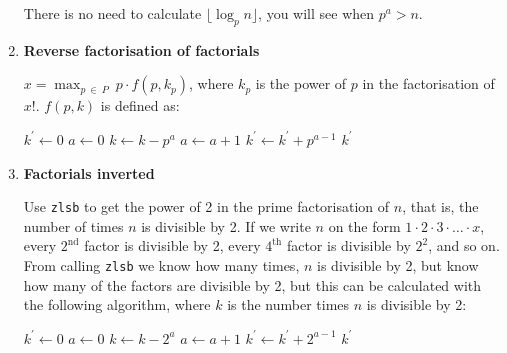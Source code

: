 \begin{enumerate}[label=\textbf{\arabic*}.]
There is no need to calculate $\lfloor \log_p n \rfloor$,
you will see when $p^a > n$.



\item \textbf{Reverse factorisation of factorials}

$\displaystyle{x = \max_{p ~\in~ P} ~ p \cdot f(p, k_p)}$,
where $k_p$ is the power of $p$ in the factorisation
of $x!$. $f(p, k)$ is defined as:

\vspace{1em}
\hspace{-2.8ex}
\begin{minipage}{\linewidth}
\begin{algorithmic}
    \STATE $k^\prime \gets 0$
      \STATE $a \gets 0$
        \STATE $k \gets k - p^a$
        \STATE $a \gets a + 1$
      \ENDWHILE
      \STATE $k^\prime \gets k^\prime + p^{a - 1}$
    \ENDWHILE
    \RETURN $k^\prime$
\end{algorithmic}
\end{minipage}
\vspace{1em}



\item \textbf{Factorials inverted}

Use \texttt{zlsb} to get the power of 2 in the
prime factorisation of $n$, that is, the number
of times $n$ is divisible by 2. If we write $n$ on
the form $1 \cdot 2 \cdot 3 \cdot \ldots \cdot x$,
every $2^\text{nd}$ factor is divisible by 2, every
$4^\text{th}$ factor is divisible by $2^2$, and so on.
From calling \texttt{zlsb} we know how many times,
$n$ is divisible by 2, but know how many of the factors
are divisible by 2, but this can be calculated with
the following algorithm, where $k$ is the number
times $n$ is divisible by 2:

\vspace{1em}
\hspace{-2.8ex}
\begin{minipage}{\linewidth}
\begin{algorithmic}
    \STATE $k^\prime \gets 0$
      \STATE $a \gets 0$
        \STATE $k \gets k - 2^a$
        \STATE $a \gets a + 1$
      \ENDWHILE
      \STATE $k^\prime \gets k^\prime + 2^{a - 1}$
    \ENDWHILE
    \RETURN $k^\prime$
\end{algorithmic}
\end{minipage}
\vspace{1em}


\end{enumerate}
